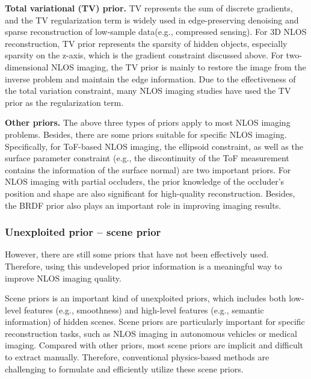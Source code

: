 \vspace{0.8em}
\noindent\textbf{Total variational (TV) prior.}
TV represents the sum of discrete gradients, and the TV regularization term is widely used in edge-preserving denoising\cite{rudin_nonlinear_1992,chambolle_introduction_2010} and sparse reconstruction of low-sample data(e.g., compressed sensing)\cite{tang_performance_2009}. For 3D NLOS reconstruction, TV prior represents the sparsity of hidden objects, especially sparsity on the z-axis, which is the gradient constraint discussed above. For two-dimensional NLOS imaging, the TV prior is mainly to restore the image from the inverse problem and maintain the edge information. Due to the effectiveness of the total variation constraint, many NLOS imaging studies have used the TV prior as the regularization term\cite{saundersComputationalPeriscopyOrdinary2019,wuNonLineofsightImaging2021,metzlerDeepinverseCorrelographyRealtime2020,tanakaPolarizedNonLineofSightImaging2020}.


\vspace{0.8em}
\noindent\textbf{Other priors.}
The above three types of priors apply to most NLOS imaging problems. Besides, there are some priors suitable for specific NLOS imaging. Specifically, for ToF-based NLOS imaging, the ellipsoid constraint\cite{otooleConfocalNonlineofsightImaging2018,veltenRecoveringThreedimensionalShape2012}, as well as the surface parameter constraint (e.g., the discontinuity of the ToF measurement contains the information of the surface normal)\cite{xinTheoryFermatPaths2019,tsaiGeometryFirstreturningPhotons2017} are two important priors. For NLOS imaging with partial occluders, the prior knowledge of the occluder's position and shape are also significant for high-quality reconstruction\cite{yedidiaUsingUnknownOccluders2019, thrampoulidisExploitingOcclusionNonLineofSight2018}. Besides, the BRDF prior also plays an important role in improving imaging results\cite{kadambiOccludedImagingTimeofflight2016}.

\subsubsection{Unexploited prior -- scene prior}
However, there are still some priors that have not been effectively used. Therefore, using this undeveloped prior information is a meaningful way to improve NLOS imaging quality.

Scene priors is an important kind of unexploited priors, which includes both low-level features (e.g., smoothness) and high-level features (e.g., semantic information) of hidden scenes. Scene priors are particularly important for specific reconstruction tasks, such as NLOS imaging in autonomous vehicles or medical imaging.
Compared with other priors, most scene priors are implicit and difficult to extract manually. Therefore, conventional physics-based methods are challenging to formulate and efficiently utilize these scene priors.


